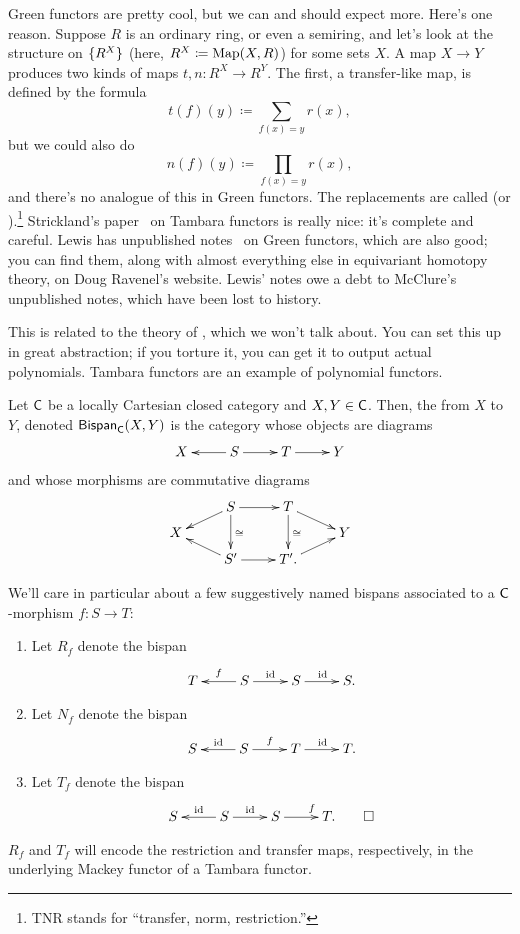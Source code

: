 Green functors are pretty cool, but we can and should expect more. Here's one reason. Suppose $R$ is an ordinary
ring, or even a semiring, and let's look at the structure on $\{R^X\}$ (here, $R^X\coloneqq \operatorname{Map}(X,R)$) for some
sets $X$. A map $X\to Y$ produces two kinds of maps $t, n\colon R^X\to R^Y$. The first, a transfer-like map, is
defined by the formula
\[t(f)(y)\coloneqq \sum_{f(x) = y} r(x),\]
but we could also do
\[n(f)(y)\coloneqq \prod_{f(x) = y} r(x),\]
and there's no analogue of this in Green functors. The replacements are called  (or ).\footnote{TNR stands for ``transfer, norm, restriction.''} Strickland's paper~\cite{StricklandTambara} on Tambara functors is really nice: it's
complete and careful. Lewis has unpublished notes~\cite{LewisGreen} on Green functors, which are also good; you can
find them, along with almost everything else in equivariant homotopy theory, on Doug Ravenel's website. Lewis'
notes owe a debt to McClure's unpublished notes, which have been lost to history.
\begin{rem}
This is related to the theory of , which we won't talk about. You can
set this up in great abstraction; if you torture it, you can get it to output actual polynomials. Tambara functors
are an example of polynomial functors.
\end{rem}
\begin{defn}
Let $\mathsf C$ be a locally Cartesian closed category and $X,Y\in\mathsf C$. Then, the  from
$X$ to $Y$, denoted $\mathsf{Bispan}_\mathsf C(X,Y)$ is the category whose objects are diagrams
\begin{equation}
\label{span1}
\xymatrix{
	X & S\ar[l]\ar[r] & T\ar[r] & Y
}
\end{equation}
and whose morphisms are commutative diagrams
\[\xymatrix@R=0.2cm{
	& S\ar[r]\ar[dl]\ar[dd]^\cong & T\ar[dd]^\cong\ar[dr]\\
	X &&& Y\\
	& S'\ar[r]\ar[ul] & T'.\ar[ur]
}\]
\end{defn}
\begin{exm}
\label{suggest_name}
We'll care in particular about a few suggestively named bispans associated to a $\mathsf C$-morphism $f\colon S\to T$:
\begin{enumerate}
	\item Let $R_f$ denote the bispan
	\[\xymatrix{
		T & S\ar[l]_f\ar[r]^\id & S\ar[r]^\id & S.
	}\]
	\item Let $N_f$ denote the bispan
	\[\xymatrix{
		S & S\ar[l]_\id\ar[r]^f & T\ar[r]^\id & T.
	}\]
	\item Let $T_f$ denote the bispan
	\[\xymatrix{
		S & S\ar[l]_\id\ar[r]^\id & S\ar[r]^f & T.\qedhere
	}\]
\end{enumerate}
\end{exm}
$R_f$ and $T_f$ will encode the restriction and transfer maps, respectively, in the underlying Mackey functor of a
Tambara functor.

